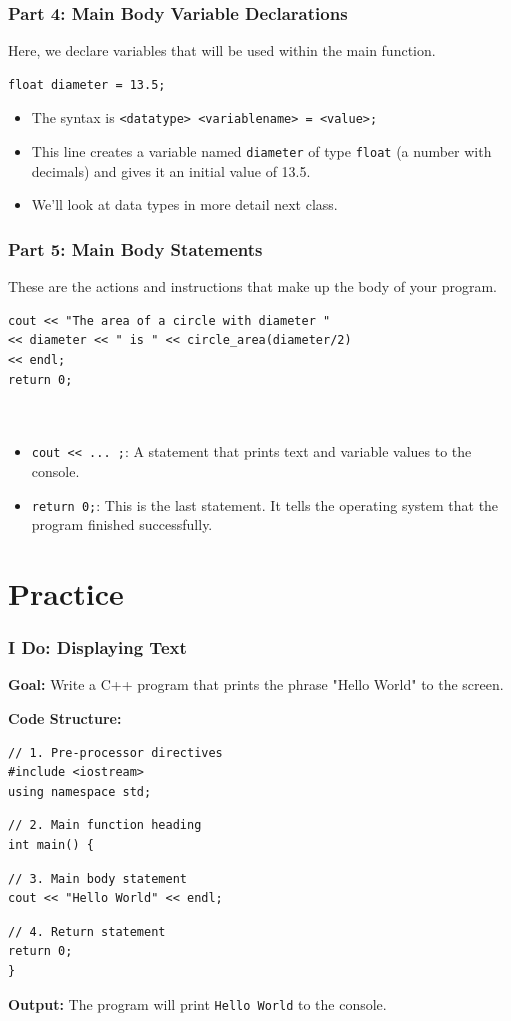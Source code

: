 \documentclass{beamer}
\begin{document}
\begin{frame}[fragile]
\frametitle{Part 4: Main Body Variable Declarations}
Here, we declare variables that will be used within the main function.
\begin{lstlisting}
float diameter = 13.5;
\end{lstlisting}
\begin{itemize}
\item The syntax is \texttt{<datatype> <variablename> = <value>;}
\item This line creates a variable named \texttt{diameter} of type \texttt{float} (a number with decimals) and gives it an initial value of 13.5.
\item We'll look at data types in more detail next class.
\end{itemize}
\end{frame}

\begin{frame}[fragile]
\frametitle{Part 5: Main Body Statements}
These are the actions and instructions that make up the body of your program.
\begin{lstlisting}
cout << "The area of a circle with diameter "
<< diameter << " is " << circle_area(diameter/2)
<< endl;
return 0;

  

\end{lstlisting}
\begin{itemize}
\item \texttt{cout << ... ;}: A statement that prints text and variable values to the console.
\item \texttt{return 0;}: This is the last statement. It tells the operating system that the program finished successfully.
\end{itemize}
\end{frame}

\section{Practice}

\begin{frame}[fragile]
\frametitle{I Do: Displaying Text}
\textbf{Goal:} Write a C++ program that prints the phrase "Hello World" to the screen.

\pause

\textbf{Code Structure:}
\begin{lstlisting}
// 1. Pre-processor directives
#include <iostream>
using namespace std;
\end{lstlisting}
\pause
\begin{lstlisting}
// 2. Main function heading
int main() {
\end{lstlisting}
\pause
\begin{lstlisting}     
// 3. Main body statement
cout << "Hello World" << endl;
\end{lstlisting}
\pause
\begin{lstlisting}    
// 4. Return statement
return 0;
}
\end{lstlisting}
\textbf{Output:} The program will print \texttt{Hello World} to the console.
\end{frame}
\end{document}
